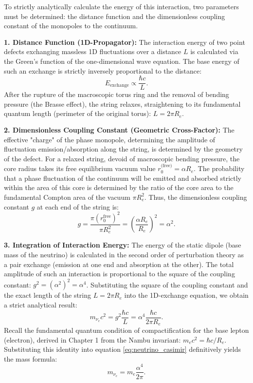 \documentclass[11pt,a4paper]{article}
\begin{document}
	To strictly analytically calculate the energy of this interaction, two parameters must be determined: the distance function and the dimensionless coupling constant of the monopoles to the continuum.
	
	\textbf{1. Distance Function (1D-Propagator):}
	The interaction energy of two point defects exchanging massless 1D fluctuations over a distance $L$ is calculated via the Green's function of the one-dimensional wave equation. The base energy of such an exchange is strictly inversely proportional to the distance:
	\begin{equation}
		E_{\text{exchange}} \propto \frac{\hbar c}{L}.
	\end{equation}
	After the rupture of the macroscopic torus ring and the removal of bending pressure (the Brasse effect), the string relaxes, straightening to its fundamental quantum length (perimeter of the original torus): $L = 2\pi R_e$.
	
	\textbf{2. Dimensionless Coupling Constant (Geometric Cross-Factor):}
	The effective "charge" of the phase monopole, determining the amplitude of fluctuation emission/absorption along the string, is determined by the geometry of the defect. 
	For a relaxed string, devoid of macroscopic bending pressure, the core radius takes its free equilibrium vacuum value $r_0^{\text{(free)}} = \alpha R_e$. 
	The probability that a phase fluctuation of the continuum will be emitted and absorbed strictly within the area of this core is determined by the ratio of the core area to the fundamental Compton area of the vacuum $\pi R_e^2$. Thus, the dimensionless coupling constant $g$ at each end of the string is:
	\begin{equation}
		g = \frac{\pi (r_0^{\text{free}})^2}{\pi R_e^2} = \left( \frac{\alpha R_e}{R_e} \right)^2 = \alpha^2.
	\end{equation}
	
	\textbf{3. Integration of Interaction Energy:}
	The energy of the static dipole (base mass of the neutrino) is calculated in the second order of perturbation theory as a pair exchange (emission at one end and absorption at the other). The total amplitude of such an interaction is proportional to the square of the coupling constant: $g^2 = (\alpha^2)^2 = \alpha^4$.
	Substituting the square of the coupling constant and the exact length of the string $L = 2\pi R_e$ into the 1D-exchange equation, we obtain a strict analytical result:
	\begin{equation}
		m_{\nu_e} c^2 = g^2 \frac{\hbar c}{L} = \alpha^4 \frac{\hbar c}{2\pi R_e}.
		\label{eq:neutrino_casimir}
	\end{equation}
	Recall the fundamental quantum condition of compactification for the base lepton (electron), derived in Chapter 1 from the Nambu invariant: $m_e c^2 = \hbar c / R_e$. Substituting this identity into equation \eqref{eq:neutrino_casimir} definitively yields the mass formula:
	\begin{equation}
		m_{\nu_e} = m_e \frac{\alpha^4}{2\pi}.
	\end{equation}
	
\end{document}
